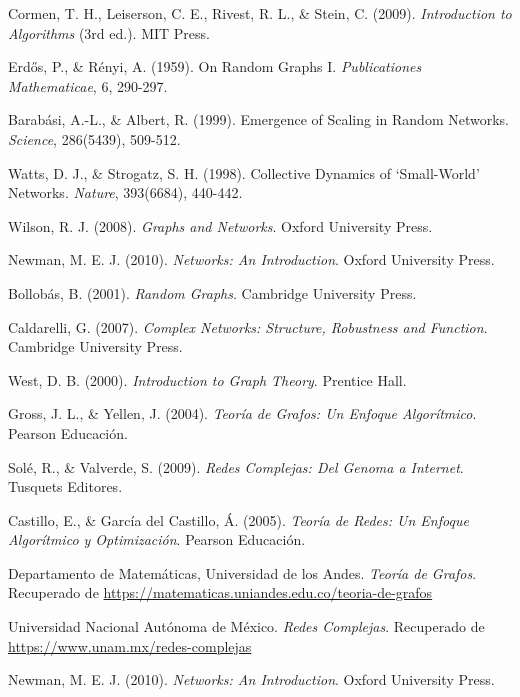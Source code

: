 \begin{thebibliography}{9}
Cormen, T. H., Leiserson, C. E., Rivest, R. L., \& Stein, C. (2009). \textit{Introduction to Algorithms} (3rd ed.). MIT Press.

    
Erdős, P., \& Rényi, A. (1959). On Random Graphs I. \textit{Publicationes Mathematicae}, 6, 290-297.

Barabási, A.-L., \& Albert, R. (1999). Emergence of Scaling in Random Networks. \textit{Science}, 286(5439), 509-512.

Watts, D. J., \& Strogatz, S. H. (1998). Collective Dynamics of ‘Small-World’ Networks. \textit{Nature}, 393(6684), 440-442.

    Wilson, R. J. (2008). \textit{Graphs and Networks}. Oxford University Press.
    
    Newman, M. E. J. (2010). \textit{Networks: An Introduction}. Oxford University Press.
    
    Bollobás, B. (2001). \textit{Random Graphs}. Cambridge University Press.
    
    Caldarelli, G. (2007). \textit{Complex Networks: Structure, Robustness and Function}. Cambridge University Press.
    
    West, D. B. (2000). \textit{Introduction to Graph Theory}. Prentice Hall.

Gross, J. L., \& Yellen, J. (2004). \textit{Teoría de Grafos: Un Enfoque Algorítmico}. Pearson Educación.

Solé, R., \& Valverde, S. (2009). \textit{Redes Complejas: Del Genoma a Internet}. Tusquets Editores.

Castillo, E., \& García del Castillo, Á. (2005). \textit{Teoría de Redes: Un Enfoque Algorítmico y Optimización}. Pearson Educación.

Departamento de Matemáticas, Universidad de los Andes. \textit{Teoría de Grafos}. Recuperado de \url{https://matematicas.uniandes.edu.co/teoria-de-grafos}

Universidad Nacional Autónoma de México. \textit{Redes Complejas}. Recuperado de \url{https://www.unam.mx/redes-complejas}

Newman, M. E. J. (2010). \textit{Networks: An Introduction}. Oxford University Press.


\end{thebibliography}

